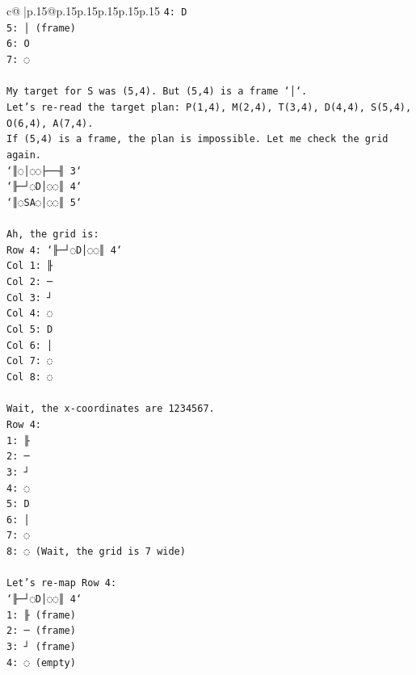 \documentclass{article}
\begin{document}
{\begin{supertabular}{c@{$\;$}|p{.15\linewidth}@{}p{.15\linewidth}p{.15\linewidth}p{.15\linewidth}p{.15\linewidth}p{.15\linewidth}}
{{{\texttt{4: D} \\
\texttt{5: │ (frame)} \\
\texttt{6: O} \\
\texttt{7: ◌} \\
\\ 
\texttt{My target for S was (5,4). But (5,4) is a frame `│`.} \\
\texttt{Let's re{-}read the target plan: P(1,4), M(2,4), T(3,4), D(4,4), S(5,4), O(6,4), A(7,4).} \\
\texttt{If (5,4) is a frame, the plan is impossible. Let me check the grid again.} \\
\texttt{`║◌│◌◌├──╢ 3`} \\
\texttt{`╟─┘◌D│◌◌║ 4`} \\
\texttt{`║◌SA◌│◌◌║ 5`} \\
\\ 
\texttt{Ah, the grid is:} \\
\texttt{Row 4: `╟─┘◌D│◌◌║ 4`} \\
\texttt{Col 1: ╟} \\
\texttt{Col 2: ─} \\
\texttt{Col 3: ┘} \\
\texttt{Col 4: ◌} \\
\texttt{Col 5: D} \\
\texttt{Col 6: │} \\
\texttt{Col 7: ◌} \\
\texttt{Col 8: ◌} \\
\\ 
\texttt{Wait, the x{-}coordinates are 1234567.} \\
\texttt{Row 4:} \\
\texttt{1: ╟} \\
\texttt{2: ─} \\
\texttt{3: ┘} \\
\texttt{4: ◌} \\
\texttt{5: D} \\
\texttt{6: │} \\
\texttt{7: ◌} \\
\texttt{8: ◌ (Wait, the grid is 7 wide)} \\
\\ 
\texttt{Let's re{-}map Row 4:} \\
\texttt{`╟─┘◌D│◌◌║ 4`} \\
\texttt{1: ╟ (frame)} \\
\texttt{2: ─ (frame)} \\
\texttt{3: ┘ (frame)} \\
\texttt{4: ◌ (empty)} \\
}}}
\end{supertabular}}
\end{document}
